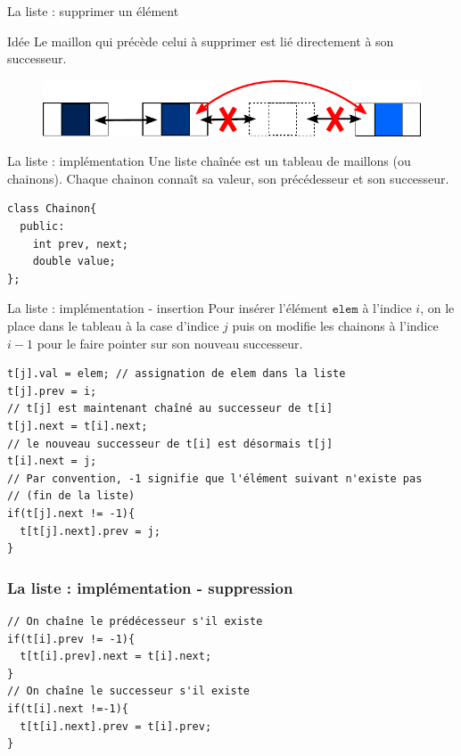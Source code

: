 \begin{frame}{La liste : supprimer un élément}
\begin{block}{Idée}
Le maillon qui précède celui à supprimer est lié directement à son successeur.
\end{block}

\begin{figure}
\centering
\includegraphics[width=0.9 \linewidth]{./images/liste03.pdf}
\end{figure}
\end{frame}

\begin{frame}[fragile]{La liste : implémentation}
Une liste chaînée est un tableau de maillons (ou chainons). Chaque chainon connaît sa valeur, son précédesseur et son successeur.
\begin{verbatim}
class Chainon{
  public:
    int prev, next;
    double value;
};
\end{verbatim}
\end{frame}

\begin{frame}[fragile]{La liste : implémentation - insertion}
Pour insérer l'élément $\texttt{elem}$ à l'indice $i$, on le place dans le tableau à la case d'indice $j$ puis on modifie les chainons à l'indice $i-1$ pour le faire pointer sur son nouveau successeur.
\begin{verbatim}
t[j].val = elem; // assignation de elem dans la liste
t[j].prev = i;
// t[j] est maintenant chaîné au successeur de t[i]
t[j].next = t[i].next;
// le nouveau successeur de t[i] est désormais t[j]
t[i].next = j;
// Par convention, -1 signifie que l'élément suivant n'existe pas
// (fin de la liste)
if(t[j].next != -1){
  t[t[j].next].prev = j;
}
\end{verbatim}
\end{frame}

\begin{frame}[fragile]
\frametitle{La liste : implémentation - suppression}
\begin{verbatim}
// On chaîne le prédécesseur s'il existe
if(t[i].prev != -1){
  t[t[i].prev].next = t[i].next;
}
// On chaîne le successeur s'il existe
if(t[i].next !=-1){
  t[t[i].next].prev = t[i].prev;
}
\end{verbatim}
\end{frame}


